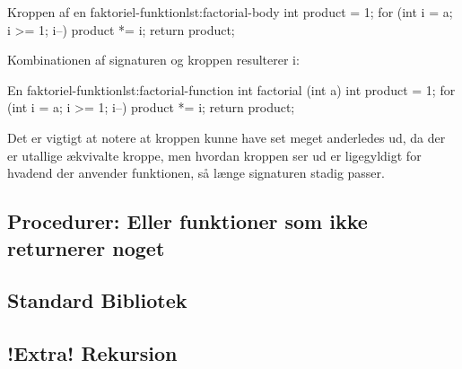 		\begin{JavaCode}{Kroppen af en faktoriel-funktion}{lst:factorial-body}
			int product = 1;
			for (int i = a; i >= 1; i--)
				product *= i;
			return product;
		\end{JavaCode}

		Kombinationen af signaturen og kroppen resulterer i:

		\begin{JavaCode}{En faktoriel-funktion}{lst:factorial-function}
			int factorial (int a) {
				int product = 1;
				for (int i = a; i >= 1; i--)
					product *= i;
				return product;
			}
		\end{JavaCode}

		Det er vigtigt at notere at kroppen kunne have set meget anderledes ud, da
		der er utallige ækvivalte kroppe, men hvordan kroppen ser ud er ligegyldigt for
		hvadend der anvender funktionen, så længe signaturen stadig passer.



	\subsection{Procedurer: Eller funktioner som ikke returnerer noget}


	\subsection{Standard Bibliotek}


	\subsection{!Extra! Rekursion}


